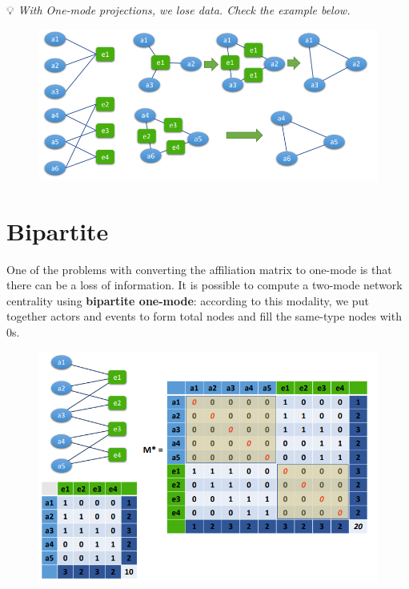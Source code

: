 \documentclass[
  notitlepage,
  onecolumn,
  openany]{book}
\begin{document}
💡 \emph{With One-mode projections, we lose data. Check the example below.}

\begin{figure}[h!]

{\centering \includegraphics[width=0.7\linewidth]{images/10-Two mode networks/Untitled 1} 

}

\end{figure}

\hypertarget{bipartite}{%
\section{Bipartite}\label{bipartite}}

One of the problems with converting the affiliation matrix to one-mode is that there can be a loss of information. It is possible to compute a two-mode network centrality using \textbf{bipartite one-mode}: according to this modality, we put together actors and events to form total nodes and fill the same-type nodes with 0s.

\begin{figure}[h!]

{\centering \includegraphics[width=0.8\linewidth]{images/10-Two mode networks/Untitled 2} 

}

\end{figure}
\end{document}
